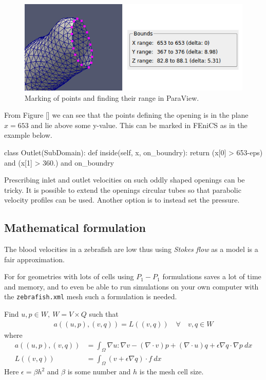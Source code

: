\documentclass[epsfig,11pt]{article}
\begin{document}
\begin{figure}[h!] 
\begin{center}
  \includegraphics[scale=0.5]{marking.png}
  \end{center}
  \caption{Marking of points and finding their range in ParaView.}
\end{figure}

From Figure [] we can see that the points defining the opening is in the plane $x = 653$ and lie above some y-value. This can be marked in FEniCS as in the example below.

\begin{python}
class Outlet(SubDomain): 
	def inside(self, x, on_boundry):
		return (x[0] > 653-eps) and (x[1] > 360.) and on_boundry
\end{python}

Prescribing inlet and outlet velocities on such oddly shaped openings can be tricky. It is possible to extend the openings circular tubes so that parabolic velocity profiles can be used. Another option is to instead set the pressure. 

\subsection{Mathematical formulation}

The blood velocities in a zebrafish are low thus using \emph{Stokes flow} as a model is a fair approximation.

For for geometries with lots of cells using $P_1-P_1$ formulations saves a lot of time and memory, and to even be able to run simulations on your own computer with the \texttt{zebrafish.xml} mesh such a formulation is needed. 

Find $u,p \in W,\: W = V \times Q $ such that
\begin{align*}
a((u,p),(v,q)) = L((v,q)) \quad \forall \quad v,q \in W 
\end{align*}
where
\begin{align*}
a((u,p),(v,q)) &= \int_\Omega \nabla u : \nabla v - (\nabla \cdot v)p + (\nabla \cdot u)q + \epsilon \nabla q \cdot \nabla p \: dx \\
L((v,q)) &= \int_\Omega  (v + \epsilon \nabla q) \cdot f \: dx
\end{align*}
Here \(\epsilon = \beta h^2\) and \(\beta\) is some number and \(h\) is the mesh cell size.
\end{document}
